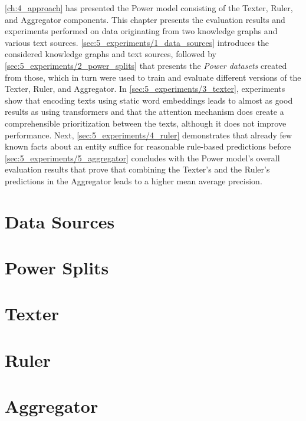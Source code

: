 \autoref{ch:4_approach} has presented the Power model consisting of the Texter, Ruler, and Aggregator components. This chapter presents the evaluation results and experiments performed on data originating from two knowledge graphs and various text sources. \autoref{sec:5_experiments/1_data_sources} introduces the considered knowledge graphs and text sources, followed by \autoref{sec:5_experiments/2_power_splits} that presents the \emph{Power datasets} created from those, which in turn were used to train and evaluate different versions of the Texter, Ruler, and Aggregator. In \autoref{sec:5_experiments/3_texter}, experiments show that encoding texts using static word embeddings leads to almost as good results as using transformers and that the attention mechanism does create a comprehensible prioritization between the texts, although it does not improve performance. Next, \autoref{sec:5_experiments/4_ruler} demonstrates that already few known facts about an entity suffice for reasonable rule-based predictions before \autoref{sec:5_experiments/5_aggregator} concludes with the Power model's overall evaluation results that prove that combining the Texter's and the Ruler's predictions in the Aggregator leads to a higher mean average precision.


\section{Data Sources}
\label{sec:5_experiments/1_data_sources}



\section{Power Splits}
\label{sec:5_experiments/2_power_splits}



\section{Texter}
\label{sec:5_experiments/3_texter}



\section{Ruler}
\label{sec:5_experiments/4_ruler}



\section{Aggregator}
\label{sec:5_experiments/5_aggregator}


